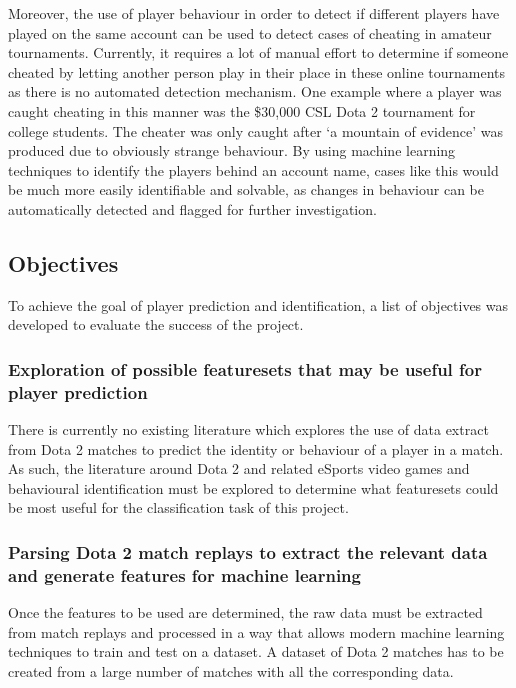 \documentclass[Report.tex]{subfiles}
\begin{document}
Moreover, the use of player behaviour in order to detect if different players have played on the same account can be used to detect cases of cheating in amateur tournaments. Currently, it requires a lot of manual effort to determine if someone cheated by letting another person play in their place in these online tournaments as there is no automated detection mechanism. One example where a player was caught cheating in this manner was the \$30,000 CSL Dota 2 tournament for college students. The cheater was only caught after `a mountain of evidence' was produced \cite{dota-cheating} due to obviously strange behaviour. By using machine learning techniques to identify the players behind an account name, cases like this would be much more easily identifiable and solvable, as changes in behaviour can be automatically detected and flagged for further investigation. 

\subsection{Objectives}
To achieve the goal of player prediction and identification, a list of objectives was developed to evaluate the success of the project. 

\subsubsection{Exploration of possible featuresets that may be useful for player prediction}
There is currently no existing literature which explores the use of data extract from Dota 2 matches to predict the identity or behaviour of a player in a match. As such, the literature around Dota 2 and related eSports video games and behavioural identification must be explored to determine what featuresets could be most useful for the classification task of this project. 

\subsubsection{Parsing Dota 2 match replays to extract the relevant data and generate features for machine learning}
Once the features to be used are determined, the raw data must be extracted from match replays and processed in a way that allows modern machine learning techniques to train and test on a dataset. A dataset of Dota 2 matches has to be created from a large number of matches with all the corresponding data. 
\end{document}
